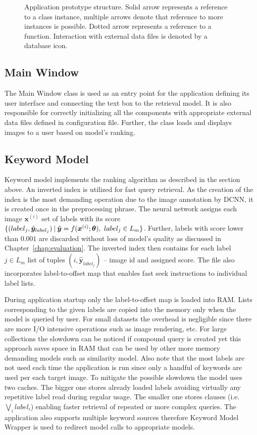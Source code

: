 \begin{figure}[ht]
	\centering
	
	
	\caption[Application prototype structure]{Application prototype structure. Solid arrow represents a reference to a class instance, multiple arrows denote that reference to more instances is possible. Dotted arrow represents a reference to a function. Interaction with external data files is denoted by a database icon.}
	\label{fig:wpf_app}
\end{figure}

\subsection{Main Window}
The Main Window class is used as an entry point for the application defining its user interface and connecting the text box to the retrieval model. It is also responsible for correctly initializing all the components with appropriate external data files defined in configuration file. Further, the class loads and displays images to a user based on model's ranking.


\subsection{Keyword Model}
Keyword model implements the ranking algorithm as described in the section above. An inverted index is utilized for fast query retrieval. As the creation of the index is the most demanding operation due to the image annotation by DCNN, it is created once in the preprocessing phrase. The neural network assigns each image $\bm{x}^{(i)}$ set of labels with its score $\{(label_j,\hat{\bm{y}}_{label_j})\:\vert\:{\hat{\bm{y}}=f(\bm{x}^{(i)};\bm{\theta})},\  {label_j\in L_m}\}$. Further, labels with score lower than $0.001$ are discarded without loss of model's quality as discussed in Chapter~\ref{chap:evaluation}. The inverted index then contains for each label $j\in L_m$ list of tuples $(i, \hat{\bm{y}}_{label_j})$ -- image id and assigned score. The file also incorporates label-to-offset map that enables fast seek instructions to individual label lists.

During application startup only the label-to-offset map is loaded into RAM. Lists corresponding to the given labels are copied into the memory only when the model is queried by user. For small datasets the overhead is negligible since there are more I/O intensive operations such as image rendering, etc. For large collections the slowdown can be noticed if compound query is created yet this approach saves space in RAM that can be used by other more memory demanding models such as similarity model. Also note that the most labels are not used each time the application is run since only a handful of keywords are used per each target image. To mitigate the possible slowdown the model uses two caches. The bigger one stores already loaded labels avoiding virtually any repetitive label read during regular usage. The smaller one stores clauses (i.e. $\bigvee_i label_i$) enabling faster retrieval of repeated or more complex queries. The application also supports multiple keyword sources therefore Keyword Model Wrapper is used to redirect model calls to appropriate models.

